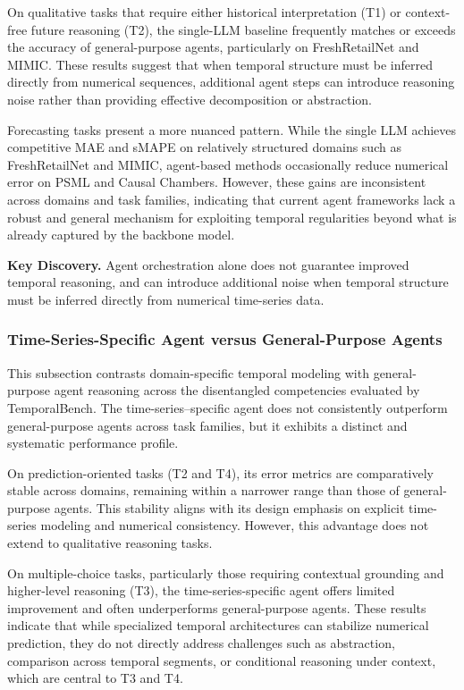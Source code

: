 On qualitative tasks that require either historical interpretation (T1) or context-free future reasoning (T2), the single-LLM baseline frequently matches or exceeds the accuracy of general-purpose agents, particularly on FreshRetailNet and MIMIC. These results suggest that when temporal structure must be inferred directly from numerical sequences, additional agent steps can introduce reasoning noise rather than providing effective decomposition or abstraction.

Forecasting tasks present a more nuanced pattern. While the single LLM achieves competitive MAE and sMAPE on relatively structured domains such as FreshRetailNet and MIMIC, agent-based methods occasionally reduce numerical error on PSML and Causal Chambers. However, these gains are inconsistent across domains and task families, indicating that current agent frameworks lack a robust and general mechanism for exploiting temporal regularities beyond what is already captured by the backbone model.

\begin{keydiscovery1}
\textbf{Key Discovery.}
Agent orchestration alone does not guarantee improved temporal reasoning, and can introduce additional noise when temporal structure must be inferred directly from numerical time-series data.
\end{keydiscovery1}

\subsubsection{Time-Series-Specific Agent versus General-Purpose Agents}
This subsection contrasts domain-specific temporal modeling with general-purpose agent reasoning across the disentangled competencies evaluated by TemporalBench. The time-series--specific agent does not consistently outperform general-purpose agents across task families, but it exhibits a distinct and systematic performance profile.

On prediction-oriented tasks (T2 and T4), its error metrics are comparatively stable across domains, remaining within a narrower range than those of general-purpose agents. This stability aligns with its design emphasis on explicit time-series modeling and numerical consistency. However, this advantage does not extend to qualitative reasoning tasks.

On multiple-choice tasks, particularly those requiring contextual grounding and higher-level reasoning (T3), the time-series-specific agent offers limited improvement and often underperforms general-purpose agents. These results indicate that while specialized temporal architectures can stabilize numerical prediction, they do not directly address challenges such as abstraction, comparison across temporal segments, or conditional reasoning under context, which are central to T3 and T4.

